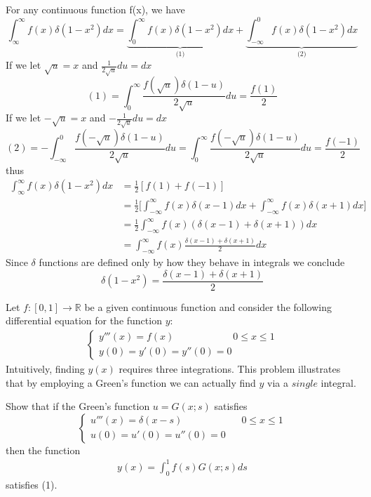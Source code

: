\documentclass[12pt]{article}
\newcommand{\R}{\mathbb{R}}
\newenvironment{problem}[2][Problem]{\begin{trivlist}
  \item[\hskip \labelsep {\bfseries #1}\hskip \labelsep {\bfseries #2:}]}{\end{trivlist}}
\newenvironment{subproblem}[2][Part]{\begin{trivlist}
  \item[\hskip \labelsep {\bfseries #1}\hskip \labelsep {\bfseries (#2)}]}{\end{trivlist}}
\newenvironment{solution}[1][Solution]{\begin{trivlist}
  \item[\hskip \labelsep {\bfseries #1} \hskip \labelsep]}{\end{trivlist}}
\theoremstyle{remark}
\begin{document}
\begin{solution}
  For any continuous function f(x), we have
  \[
    \int_{\infty}^{\infty}f(x)\delta(1-x^2)dx =
    \underbrace{\int_{0}^{\infty}f(x)\delta(1-x^2)dx}_\text{(1)} +
    \underbrace{\int_{-\infty}^{0}f(x)\delta(1-x^2)dx}_\text{(2)}
  \]
  If we let \(\sqrt{u} = x\) and \(\frac{1}{2\sqrt{u}}du = dx\)
  \[
    (1) = \int_{0}^{\infty}\frac{f(\sqrt{u})\delta(1-u)}{2\sqrt{u}}du = \frac{f(1)}{2}
  \]
  If we let \(-\sqrt{u} = x\) and \(-\frac{1}{2\sqrt{u}}du = dx\)
  \[
    (2) = -\int_{-\infty}^{0}\frac{f(-\sqrt{u})\delta(1-u)}{2\sqrt{u}}du
    = \int_{0}^{\infty}\frac{f(-\sqrt{u})\delta(1-u)}{2\sqrt{u}}du
    = \frac{f(-1)}{2}
  \]
  thus
  \begin{align*}
    \int_{\infty}^{\infty}f(x)\delta(1-x^2)dx
    &= \frac{1}{2}[f(1) + f(-1)] \\
    &= \frac{1}{2}\bigg[\int_{-\infty}^{\infty}f(x)\delta(x-1)dx +
      \int_{-\infty}^{\infty}f(x)\delta(x+1)dx\bigg] \\
    &= \frac{1}{2}\int_{-\infty}^{\infty}f(x)(\delta(x-1) + \delta(x+1)) dx \\
    &= \int_{-\infty}^{\infty}f(x)\frac{\delta(x-1) + \delta(x+1)}{2} dx
  \end{align*}
  Since \(\delta\) functions are defined only by how they behave in integrals we conclude
  \[
    \boxed{\delta(1-x^2) = \frac{\delta(x-1)+\delta(x+1)}{2}}
  \]
\end{solution}
\clearpage
\begin{problem}{3}
  Let \(f : [0,1] \rightarrow \R\) be a given continuous function
  and consider the following differential equation for the function \(y\):
  \begin{align}
    \left\{
      \begin{array}{ll}
        y'''(x) = f(x) \qquad\qquad\qquad 0 \le x \le 1 \\
        y(0) = y'(0) = y''(0) = 0
      \end{array}
    \right.
  \end{align}
  Intuitively, finding \(y(x)\) requires three integrations. This problem illustrates that
  by employing a Green's function we can actually find \(y\) via a $single$ integral.
\end{problem}
\begin{subproblem}{a}
  Show that if the Green's function \(u = G(x;s)\) satisfies
  \[
    \left\{
      \begin{array}{ll}
        u'''(x) = \delta(x-s) \qquad\qquad\qquad 0 \le x \le 1 \\
        u(0) = u'(0) = u''(0) = 0
      \end{array}
    \right.
  \]
  then the function
  \begin{align}
    y(x) = \int_{0}^{1}f(s)G(x;s)ds
  \end{align}
  satisfies (1).
\end{subproblem}
\end{document}
